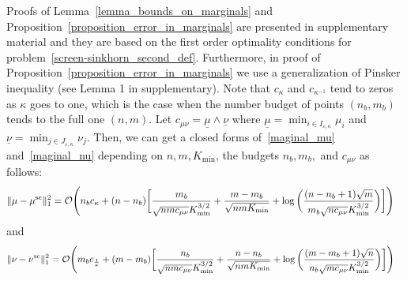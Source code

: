 Proofs of Lemma~\ref{lemma_bounds_on_marginals} and Proposition~\ref{proposition_error_in_marginals} are presented in supplementary material and they are based on the first order optimality conditions for problem~\eqref{screen-sinkhorn_second_def}. 
Furthermore, in proof of Proposition~\ref{proposition_error_in_marginals} we use a generalization of Pinsker inequality (see Lemma 1 in supplementary). 
Note that $c_\kappa$ and $c_{\kappa^{-1}}$ tend to zeros as $\kappa$ goes to one, which is the case when the number budget of points $(n_b,m_b)$ tends to the full one $(n,m)$.
Let $c_{\mu\nu} = \underline{\mu}\wedge \underline{\nu}$ where $\underline{\mu} = \min_{i\in I_{\varepsilon,\kappa}}\mu_i$ and $\underline{\nu} = \min_{j\in J_{\varepsilon,\kappa}}\nu_j$.
Then, we can get a closed forms of~\eqref{maginal_mu} and~\eqref{maginal_nu} depending on $n,m,K_{\min}$, the budgets $n_b,m_b,$ and $c_{\mu\nu}$ as follows:
\begin{align*}
{\|{\mu} -{\mu}^{\text{sc}}\|^2_1} = \mathcal{O}\Bigg(n_bc_\kappa + (n- n_b) \bigg[\frac{m_b}{\sqrt{nmc_{\mu\nu}}K_{\min}^{3/2}} &+ \frac{m-m_b}{\sqrt{nmK_{\min}}}
 + \log\bigg(\frac{(n-n_b+1)\sqrt{m}}{m_b \sqrt{nc_{\mu\nu}}K_{\min}^{3/2}} 
\bigg)\bigg]\Bigg)
\end{align*}
and 
\begin{align*}
{\|{\nu} -{\nu}^{\text{sc}}\|^2_1} = \mathcal{O}\Bigg(m_bc_{\frac1\kappa} + (m- m_b) \bigg[\frac{n_b}{\sqrt{nmc_{\mu\nu}}K_{\min}^{3/2}} &+ \frac{n-n_b}{\sqrt{nmK_{\min}}}
 + \log\bigg(\frac{(m-m_b+1)\sqrt{n}}{n_b \sqrt{mc_{\mu\nu}}K_{\min}^{3/2}} 
\bigg)\bigg]\Bigg)
\end{align*}

